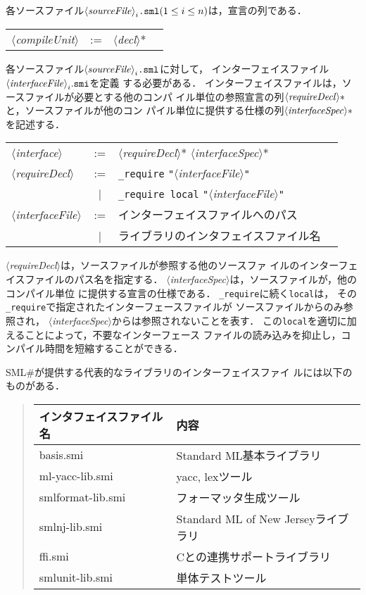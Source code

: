 \documentclass{jbook}
\newcommand{\smlsharp}{SML\#}
\newcommand{\vbar}{\mbox{\ $|$\ }}
\newcommand{\nonterm}[1]{\mbox{$\langle$}{\it #1}\mbox{$\rangle$}}
\newcommand{\term}[1]{\mbox{{\tt #1}}}
\begin{document}
	各ソースファイル$\nonterm{sourceFile}_i\mbox{\tt .sml} (1\le i
\le n)$は，宣言の列である．

\begin{center}
\begin{tabular}{lcll}
\nonterm{compileUnit} &:=& \nonterm{decl}*
\end{tabular}
\end{center}

	各ソースファイル$\nonterm{sourceFile}_i\mbox{\tt .sml}$に対して，
インターフェイスファイル$\nonterm{interfaceFile}_i.\mbox{\tt smi}$を定義
する必要がある．
	インターフェイスファイルは，ソースファイルが必要とする他のコンパ
イル単位の参照宣言の列$\nonterm{requireDecl}*$と，ソースファイルが他のコン
パイル単位に提供する仕様の列$\nonterm{interfaceSpec}*$を記述する．

\begin{center}
\begin{tabular}{lcll}
\nonterm{interface} &:=& \nonterm{requireDecl}* \nonterm{interfaceSpec}*
\\
\nonterm{requireDecl} &:=& \term{\_require} \term{"}\nonterm{interfaceFile}\term{"}\\

&\vbar& \term{\_require local} \term{"}\nonterm{interfaceFile}\term{"}
\\
\nonterm{interfaceFile} &:=& インターフェイスファイルへのパス\\
                        &\vbar& ライブラリのインタフェイスファイル名
\end{tabular}
\end{center}

	\nonterm{requireDecl}は，ソースファイルが参照する他のソースファ
イルのインターフェイスファイルのパス名を指定する．
	\nonterm{interfaceSpec}は，ソースファイルが，他のコンパイル単位
に提供する宣言の仕様である．
	\term{\_require}に続く\term{local}は，
その\term{\_require}で指定されたインターフェースファイルが
ソースファイルからのみ参照され，
\nonterm{interfaceSpec}からは参照されないことを表す．
	この\term{local}を適切に加えることによって，不要なインターフェース
ファイルの読み込みを抑止し，コンパイル時間を短縮することができる．

	\smlsharp{}が提供する代表的なライブラリのインターフェイスファイ
ルには以下のものがある．

\begin{quote}
\begin{tabular}{|l|l|}
\hline
インタフェイスファイル名 & 内容
\\\hline
\hline
basis.smi & Standard ML基本ライブラリ\\
ml-yacc-lib.smi & yacc, lexツール\\
smlformat-lib.smi & フォーマッタ生成ツール\\
smlnj-lib.smi & Standard ML of New Jerseyライブラリ\\
ffi.smi & Cとの連携サポートライブラリ\\
smlunit-lib.smi & 単体テストツール
\\\hline
\end{tabular}
\end{quote}
\end{document}
